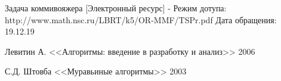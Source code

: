 \newpage
{}

\begin{thebibliography}{}
     Задача коммивояжера [Электронный ресурс] - Режим дотупа: http://www.math.nsc.ru/LBRT/k5/OR-MMF/TSPr.pdf Дата обращения: 19.12.19

     Левитин А. <<Алгоритмы: введение в разработку и анализ>> 2006

     С.Д. Штовба <<Муравьиные алгоритмы>> 2003
\end{thebibliography}
